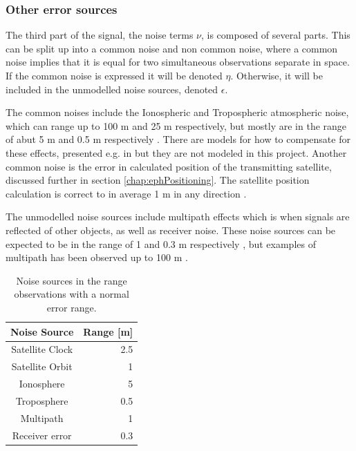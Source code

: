 \subsubsection{Other error sources}\label{errorSources}
The third part of the signal, the noise terms $\nu$, is composed of several parts. This can be split up into a common noise and non common noise, where a common noise implies that it is equal for two simultaneous observations separate in space. If the common noise is expressed it will be denoted $\eta$. Otherwise, it will be included in the unmodelled noise sources, denoted $\epsilon$.
\par
The common noises include the Ionospheric and Tropospheric atmospheric noise, which can range up to 100 m \cite{IonoNoise} and 25 m \cite{williams2017tropospheric} respectively, but mostly are in the range of abut 5 m and 0.5 m respectively \cite{Jeffrey}. There are models for how to compensate for these effects, presented e.g. in \cite{Karaim2018Chapter4G} but they are not modeled in this project. Another common noise is the error in calculated position of the transmitting satellite, discussed further in section \ref{chap:ephPositioning}. The satellite position calculation is correct to in average 1 m in any direction \cite{satPos}. 
\par 
The unmodelled noise sources include multipath effects which is when signals are reflected of other objects, as well as receiver noise. These noise sources can be expected to be in the range of 1 and 0.3 m respectively \cite{Jeffrey}, but examples of multipath has been observed up to 100 m \cite{Karaim2018Chapter4G}.  

\begin{table}[h!]
  \begin{center}
    \begin{tabular}{|c|r|}\hline
		\textbf{Noise Source}& \textbf{Range} [m] \\      \hline
      	Satellite Clock & 	2.5 \\ \hline
		Satellite Orbit & 	1 \\ \hline
		Ionosphere & 		5 \\ \hline
		Troposphere&		0.5\\ \hline
		Multipath &			1 \\ \hline
		Receiver error & 	0.3 \\ \hline
    \end{tabular}
    \caption{\label{tableNoise} Noise sources in the range observations with a normal error range.}
  \end{center}
\end{table}


